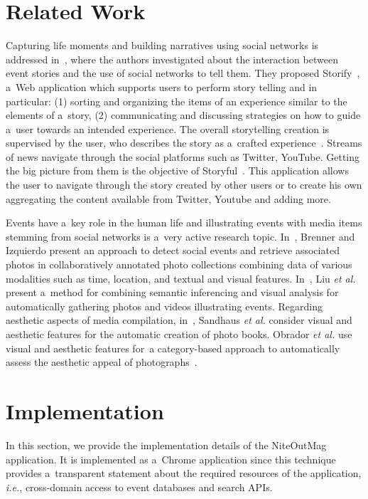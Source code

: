 \documentclass[runningheads,a4paper]{llncs}
\begin{document}
{%

\section{Related Work}                                                      \label{sec:related-work}
Capturing life moments and building narratives using social networks is addressed in~\cite{Atosy2011}, where the authors investigated about the interaction between event stories and the use of social networks to tell them. They proposed Storify~\cite{Storify2012}, a~Web application which supports users to perform story telling and in particular: (1) sorting and organizing the items of an experience similar to the elements of a~story, (2) communicating and discussing strategies on how to guide a~user towards an intended experience. The overall storytelling creation is supervised by the user, who describes the story as a~crafted experience~\cite{Hassenzahl2010}. Streams of news navigate through the social platforms such as Twitter, YouTube. Getting the big picture from them is the objective of Storyful~\cite{Storyful2012}. This application allows the user to navigate through the story created by other users or to create his own aggregating the content available from Twitter, Youtube and adding more.

Events have a~key role in the human life and illustrating events with media items stemming from social networks is a~very active research topic. In~\cite{Brenner2012}, Brenner and Izquierdo present an approach to detect social events and retrieve associated photos in collaboratively annotated photo collections combining data of various modalities such as time, location, and textual and visual features. In~\cite{Liu2011}, Liu \emph{et al.} present a~method for combining semantic inferencing and visual analysis for automatically gathering photos and videos illustrating events. Regarding aesthetic aspects of media compilation, in~\cite{Sandhaus2011}, Sandhaus \emph{et al.} consider visual and aesthetic features for the automatic creation of photo books. Obrador \emph{et al.} use visual and aesthetic features for~a category-based approach to automatically assess the aesthetic appeal of photographs~\cite{Obrador2012}.


\section{Implementation}                                                    \label{sec:implementation}
In this section, we provide the implementation details of the NiteOutMag application. It is implemented as a~Chrome application since this technique provides a~transparent statement about the required resources of the application, \emph{i.e.}, cross-domain access to event databases and search APIs.

}
\end{document}
